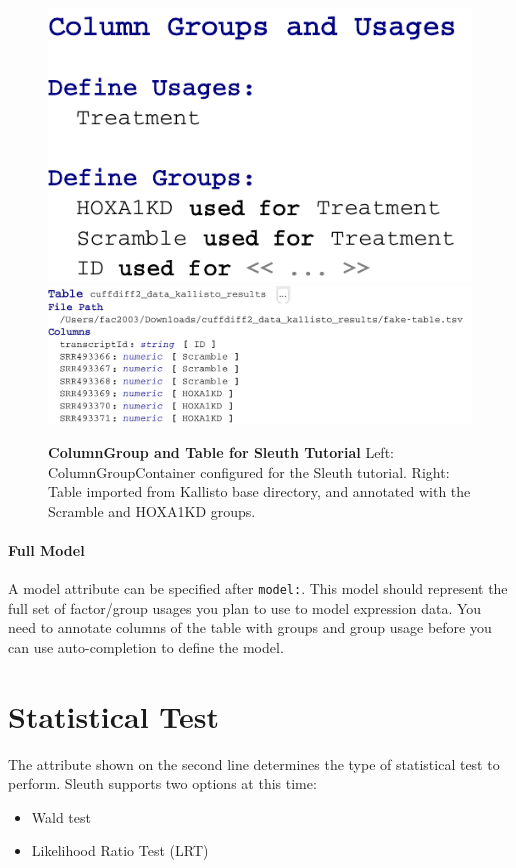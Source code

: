 \begin{figure}[h!tbp]
  \includegraphics[width=\figWidthTiny]{figures/AnnotatedColumnGroupSleuth-1.pdf}
    \includegraphics[width=\figWidthWide]{figures/AnnotatedTableSleuth-1.pdf}
\caption[ColumnGroup and Table for Sleuth Tutorial]{\textbf{ColumnGroup and Table for Sleuth Tutorial} Left: ColumnGroupContainer configured for the Sleuth tutorial. Right: Table imported from Kallisto base directory, and annotated with the Scramble and HOXA1KD groups.}
\label{fig:AnnotatedTable}
\end{figure}

\paragraph{Full Model}
A model attribute can be specified after \texttt{model:}. This model should represent the full set of factor/group usages you plan to use to model expression data. You need to annotate columns of the table with groups and group usage before you can use auto-completion to define the model. 

\section{Statistical Test}
The attribute shown on the second line determines the type of statistical test to perform. Sleuth supports two options at this time:
\begin{itemize}
  \item Wald test
  \item Likelihood Ratio Test (LRT)
\end{itemize}

